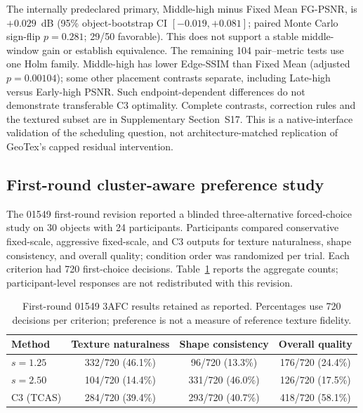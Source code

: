 \documentclass[times,twocolumn,final]{elsarticle}
\begin{document}
The internally predeclared primary, Middle-high minus Fixed Mean FG-PSNR, is $+0.029$~dB (95\% object-bootstrap CI $[-0.019,+0.081]$; paired Monte Carlo sign-flip $p=0.281$; 29/50 favorable). This does not support a stable middle-window gain or establish equivalence. The remaining 104 pair--metric tests use one Holm family. Middle-high has lower Edge-SSIM than Fixed Mean (adjusted $p=0.00104$); some other placement contrasts separate, including Late-high versus Early-high PSNR. Such endpoint-dependent differences do not demonstrate transferable C3 optimality. Complete contrasts, correction rules and the textured subset are in Supplementary Section~S17. This is a native-interface validation of the scheduling question, not architecture-matched replication of GeoTex's capped residual intervention.

\subsection{First-round cluster-aware preference study}
\label{subsec:preference}

The 01549 first-round revision reported a blinded three-alternative forced-choice study on 30 objects with 24 participants. Participants compared conservative fixed-scale, aggressive fixed-scale, and C3 outputs for texture naturalness, shape consistency, and overall quality; condition order was randomized per trial. Each criterion had 720 first-choice decisions. Table~\ref{tab:preference} reports the aggregate counts; participant-level responses are not redistributed with this revision.

\begin{table}[t]
\centering\scriptsize
\caption{First-round 01549 3AFC results retained as reported. Percentages use 720 decisions per criterion; preference is not a measure of reference texture fidelity.}
\label{tab:preference}
\setlength{\tabcolsep}{3pt}
\begin{tabular}{lccc}
\toprule
Method & Texture naturalness & Shape consistency & Overall quality \\
\midrule
$s=1.25$ & 332/720 (46.1\%) & 96/720 (13.3\%) & 176/720 (24.4\%) \\
$s=2.50$ & 104/720 (14.4\%) & 331/720 (46.0\%) & 126/720 (17.5\%) \\
C3 (TCAS) & 284/720 (39.4\%) & 293/720 (40.7\%) & 418/720 (58.1\%) \\
\bottomrule
\end{tabular}
\end{table}
\end{document}
